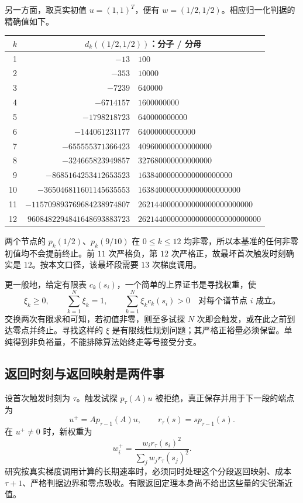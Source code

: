 \documentclass[11pt,a4paper,UTF8,fontset=fandol]{ctexart}
\theoremstyle{remark}\newtheorem{remark}[theorem]{说明}
\begin{document}
另一方面，取真实初值 $u=(1,1)^T$，便有 $w=(1/2,1/2)$。相应归一化判据的精确值如下。
\begin{center}\small
\begin{tabular}{r@{\qquad}r@{\,/\,}l}
\toprule
$k$ & \multicolumn{2}{c}{$d_k((1/2,1/2))$：分子 / 分母}\\
\midrule
1 & $-13$ & $100$\\
2 & $-353$ & $10000$\\
3 & $-7239$ & $640000$\\
4 & $-6714157$ & $1600000000$\\
5 & $-1798218723$ & $640000000000$\\
6 & $-144061231177$ & $64000000000000$\\
7 & $-655555371366423$ & $409600000000000000$\\
8 & $-324665823949857$ & $327680000000000000$\\
9 & $-8685164253412653523$ & $16384000000000000000000$\\
10 & $-365046811601145635553$ & $1638400000000000000000000$\\
11 & $-115709893769684238974807$ & $2621440000000000000000000000$\\
12 & $9608482294841648693883723$ & $262144000000000000000000000000$\\
\bottomrule
\end{tabular}
\end{center}
两个节点的 $p_k(1/2)$、$p_k(9/10)$ 在 $0\le k\le12$ 均非零，所以本基准的任何非零初值均不会提前终止。前 $11$ 次严格负，第 $12$ 次严格正，故最坏首次触发时刻确实是 $12$。按本文口径，该最坏段需要 $13$ 次梯度调用。

更一般地，给定有限表 $c_k(s_i)$，一个简单的上界证书是寻找权重，使
\[
 \xi_k\ge0,\qquad\sum_{k=1}^N\xi_k=1,\qquad
 \sum_{k=1}^N\xi_kc_k(s_i)>0\quad\text{对每个谱节点 }i\text{ 成立。}
\]
交换两次有限求和可知，若初值非零，则至多试探 $N$ 次即会触发，或在此之前到达零点并终止。寻找这样的
$\xi$ 是有限线性规划问题；其严格正裕量必须保留。单纯得到非负裕量，不能排除算法始终走等号接受分支。

\subsection{返回时刻与返回映射是两件事}
设首次触发时刻为 $\tau$。触发试探 $p_\tau(A)u$ 被拒绝，真正保存并用于下一段的端点为
\begin{equation}\label{eq:accepted-map}
 u^+=A p_{\tau-1}(A)u,\qquad r_\tau(s)=s p_{\tau-1}(s).
\end{equation}
在 $u^+\ne0$ 时，新权重为
\[
 w_i^+=\frac{w_i r_\tau(s_i)^2}
 {\sum_jw_j r_\tau(s_j)^2}.
\]
研究按真实梯度调用计算的长期速率时，必须同时处理这个分段返回映射、成本 $\tau+1$、严格判据边界和零点吸收。有限返回定理本身尚不给出这些量的尖锐渐近值。
\end{document}
